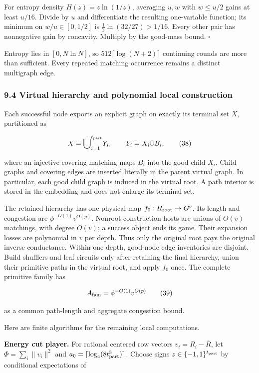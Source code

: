 For entropy density \(H(z)=z\ln(1/z)\), averaging \(u,w\) with \(w\leq u/2\) gains at least \(u/16\). Divide by \(u\) and differentiate the resulting one-variable function; its minimum on \(w/u\in[0,1/2]\) is \(\frac12\ln(32/27)>1/16\). Every other pair has nonnegative gain by concavity. Multiply by the good-mass bound. \hfill\(\square\)

Entropy lies in \([0,N\ln N]\), so \(512\lceil\log(N+2)\rceil\) continuing rounds are more than sufficient. Every repeated matching occurrence remains a distinct multigraph edge.

\hypertarget{af-46593eb93e-virtual-hierarchy-and-polynomial-local-construction}{%
\subsubsection{9.4 Virtual hierarchy and polynomial local construction}\label{af-46593eb93e-virtual-hierarchy-and-polynomial-local-construction}}

Each successful node exports an explicit graph on exactly its terminal set \(X\), partitioned as

\[
X=\dot\bigcup_{i=1}^{t_{\rm part}}Y_i,\qquad
 Y_i=X_i\dot\cup B_i,
 \tag{38}
\]

where an injective covering matching maps \(B_i\) into the good child \(X_i\). Child graphs and covering edges are inserted literally in the parent virtual graph. In particular, each good child graph is induced in the virtual root. A path interior is stored in the embedding and does not enlarge its terminal set.

The retained hierarchy has one physical map \(f_0:H_{\rm root}\to G^\diamond\). Its length and congestion are \(\phi^{-O(1)}v^{O(p)}\). Nonroot construction hosts are unions of \(O(v)\) matchings, with degree \(O(v)\); a success object ends its game. Their expansion losses are polynomial in \(v\) per depth. Thus only the original root pays the original inverse conductance. Within one depth, good-node edge inventories are disjoint. Build shufflers and leaf circuits only after retaining the final hierarchy, union their primitive paths in the virtual root, and apply \(f_0\) once. The complete primitive family has

\[
A_{\rm fam}=\phi^{-O(1)}v^{O(p)}
 \tag{39}
\]

as a common path-length and aggregate congestion bound.

Here are finite algorithms for the remaining local computations.

\textbf{Energy cut player.} For rational centered row vectors \(v_i=R_i-\overline R\), let \(\Phi=\sum_i\|v_i\|^2\) and \(a_0=\lceil\log_4(8t_{\rm part}^3)\rceil\). Choose signs \(z\in\{-1,1\}^{t_{\rm part}}\) by conditional expectations of


